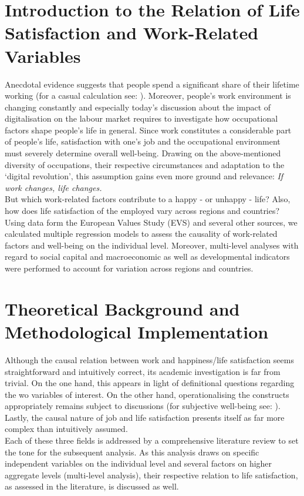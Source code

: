 \documentclass[preprint,12pt,authoryear]{elsarticle}
\begin{document}
	\section{Introduction to the Relation of Life Satisfaction and Work-Related Variables}
	Anecdotal evidence suggests that people spend a significant share of their lifetime working (for a casual calculation 
	see: \citet{thompson_what_2016}). Moreover, people's work environment is changing constantly and especially today's 
	discussion about the impact of digitalisation on the labour market requires to investigate how occupational factors shape 
	people's life in general. Since work constitutes a considerable part of people’s life, satisfaction with one’s job and the
	occupational environment must severely determine overall well-being. Drawing on the above-mentioned diversity of 
	occupations, their respective circumstances and adaptation to the ‘digital revolution’, this assumption gains even more 
	ground and relevance: \textit{If work changes, life changes.} \\
	But which work-related factors contribute to a happy - or unhappy - life? Also, how does life satisfaction of the employed
	vary across regions and countries? \\
	Using data form the European Values Study (EVS) and several other sources, we calculated multiple regression models to assess the causality of work-related factors and well-being on the individual level. Moreover, multi-level analyses with regard to social capital and
	macroeconomic as well as developmental indicators were performed to account for variation across regions and countries. 
		
	\section{Theoretical Background and Methodological Implementation}
	Although the causal relation between work and happiness/life satisfaction seems straightforward and intuitively correct,
	its academic investigation is far from trivial. On the one hand, this appears in light of definitional questions regarding the 
	wo variables of interest. On the other hand, operationalising the constructs appropriately remains subject to discussions
	(for subjective well-being see: \citet{kahneman_developments_2006,layard_measuring_2010}). Lastly, the causal nature of job and life
	satisfaction presents itself as far more complex than intuitively assumed. \\
	Each of these three fields is addressed by a comprehensive literature review to set the tone for the subsequent analysis.
	As this analysis draws on specific independent variables on the individual level and several factors on higher aggregate
	levels (multi-level analysis), their respective relation to life satisfaction, as assessed in the literature, is discussed as well.
	
\end{document}

